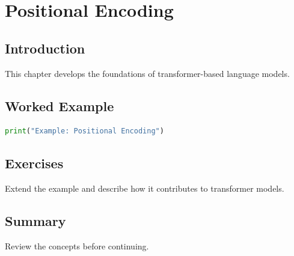 \chapter{Positional Encoding}
\label{chap:vol8-14}
\section{Introduction}
This chapter develops the foundations of transformer-based language models.

\section{Worked Example}
\begin{lstlisting}[language=Python]
print("Example: Positional Encoding")
\end{lstlisting}

\section{Exercises}
\begin{exercise}
Extend the example and describe how it contributes to transformer models.
\end{exercise}

\section{Summary}
Review the concepts before continuing.
